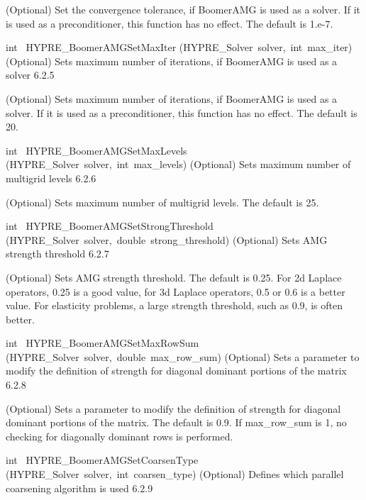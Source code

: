 \documentclass{article}
\begin{document}
\begin{cxxentry}
\begin{cxxentry}
\begin{cxxfunction}
\begin{cxxdoc}
(Optional) Set the convergence tolerance, if BoomerAMG is used
as a solver. If it is used as a preconditioner, this function has
no effect. The default is 1.e-7.
\end{cxxdoc}
\end{cxxfunction}
\begin{cxxfunction}
{int\ }
        {HYPRE\_BoomerAMGSetMaxIter}
        {(HYPRE\_Solver\ solver,\ int\ max\_iter)}
        {
(Optional) Sets maximum number of iterations, if BoomerAMG is used
as a solver}
        {6.2.5}
\begin{cxxdoc}

(Optional) Sets maximum number of iterations, if BoomerAMG is used
as a solver. If it is used as a preconditioner, this function has
no effect. The default is 20.
\end{cxxdoc}
\end{cxxfunction}
\begin{cxxfunction}
{int\ }
        {HYPRE\_BoomerAMGSetMaxLevels}
        {(HYPRE\_Solver\ solver,\ int\ max\_levels)}
        {
(Optional) Sets maximum number of multigrid levels}
        {6.2.6}
\begin{cxxdoc}

(Optional) Sets maximum number of multigrid levels.
The default is 25.
\end{cxxdoc}
\end{cxxfunction}
\begin{cxxfunction}
{int\ }
        {HYPRE\_BoomerAMGSetStrongThreshold}
        {(HYPRE\_Solver\ solver,\ double\ strong\_threshold)}
        {
(Optional) Sets AMG strength threshold}
        {6.2.7}
\begin{cxxdoc}

(Optional) Sets AMG strength threshold. The default is 0.25.
For 2d Laplace operators, 0.25 is a good value, for 3d Laplace
operators, 0.5 or 0.6 is a better value. For elasticity problems,
a large strength threshold, such as 0.9, is often better.
\end{cxxdoc}
\end{cxxfunction}
\begin{cxxfunction}
{int\ }
        {HYPRE\_BoomerAMGSetMaxRowSum}
        {(HYPRE\_Solver\ solver,\ double\ max\_row\_sum)}
        {
(Optional) Sets a parameter to modify the definition of strength for
diagonal dominant portions of the matrix}
        {6.2.8}
\begin{cxxdoc}

(Optional) Sets a parameter to modify the definition of strength for
diagonal dominant portions of the matrix. The default is 0.9.
If max\_row\_sum is 1, no checking for diagonally dominant rows is
performed.
\end{cxxdoc}
\end{cxxfunction}
\begin{cxxfunction}
{int\ }
        {HYPRE\_BoomerAMGSetCoarsenType}
        {(HYPRE\_Solver\ solver,\ int\ coarsen\_type)}
        {
(Optional) Defines which parallel coarsening algorithm is used}
        {6.2.9}
\begin{cxxdoc}


\end{cxxdoc}
\end{cxxfunction}
\end{cxxentry}
\end{cxxentry}
\end{document}
